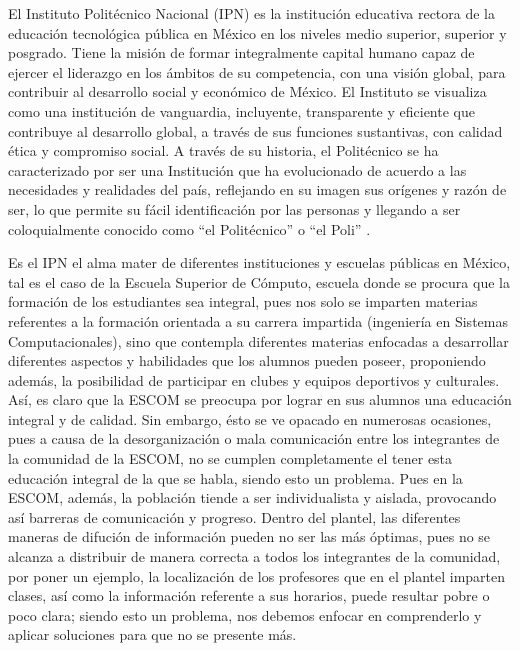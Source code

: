 \noindent
El Instituto Politécnico Nacional (IPN) es la institución educativa rectora de la educación tecnológica pública en México en los niveles medio superior, superior y posgrado. Tiene la misión de formar integralmente capital humano capaz de ejercer el liderazgo en los ámbitos de su competencia, con una visión global, para contribuir al desarrollo social y económico de México. 
El Instituto se visualiza como una institución de vanguardia, incluyente, transparente y eficiente que contribuye al desarrollo global, a través de sus funciones sustantivas, con calidad ética y compromiso social. 
A través de su historia, el Politécnico se ha caracterizado por ser una Institución que ha evolucionado de acuerdo a las necesidades y realidades del país, reflejando en su imagen sus orígenes y razón de ser, lo que permite su fácil identificación por las personas y llegando a ser coloquialmente conocido como “el Politécnico” o “el Poli” \cite{IPN}.  

\noindent
\newline
Es el IPN el alma mater de diferentes instituciones y escuelas públicas en México, tal es el caso de la Escuela Superior de Cómputo, escuela donde se procura que la formación de los estudiantes sea integral, pues nos solo se imparten materias referentes a la formación orientada a su carrera impartida (ingeniería en Sistemas Computacionales), sino que contempla diferentes materias enfocadas a desarrollar diferentes aspectos y habilidades que los alumnos pueden poseer, proponiendo además, la posibilidad de participar en clubes y equipos deportivos y culturales. Así, es claro que la ESCOM se preocupa por lograr en sus alumnos una educación integral y de calidad. Sin embargo, ésto se ve opacado en numerosas ocasiones, pues a causa de la desorganización o mala comunicación entre los integrantes de la comunidad de la ESCOM, no se cumplen completamente el tener esta educación integral de la que se habla, siendo esto un problema. Pues en la ESCOM, además, la población tiende a ser individualista y aislada, provocando así barreras de comunicación y progreso. Dentro del plantel, las diferentes maneras de difución de información pueden no ser las más óptimas, pues no se alcanza a distribuir de manera correcta a todos los integrantes de la comunidad, por poner un ejemplo, la localización de los profesores que en el plantel imparten clases, así como la información referente a sus horarios, puede resultar pobre o poco clara; siendo esto un problema, nos debemos enfocar en comprenderlo y aplicar soluciones para que no se presente más. 

